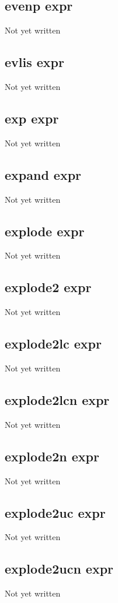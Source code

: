 \documentclass[a4paper,11pt]{article}
\begin{document}
\subsection{\ttfamily evenp expr}
Not yet written

\subsection{\ttfamily evlis expr}
Not yet written

\subsection{\ttfamily exp expr}
Not yet written

\subsection{\ttfamily expand expr}
Not yet written

\subsection{\ttfamily explode expr}
Not yet written

\subsection{\ttfamily explode2 expr}
Not yet written

\subsection{\ttfamily explode2lc expr}
Not yet written

\subsection{\ttfamily explode2lcn expr}
Not yet written

\subsection{\ttfamily explode2n expr}
Not yet written

\subsection{\ttfamily explode2uc expr}
Not yet written

\subsection{\ttfamily explode2ucn expr}
Not yet written
\end{document}
